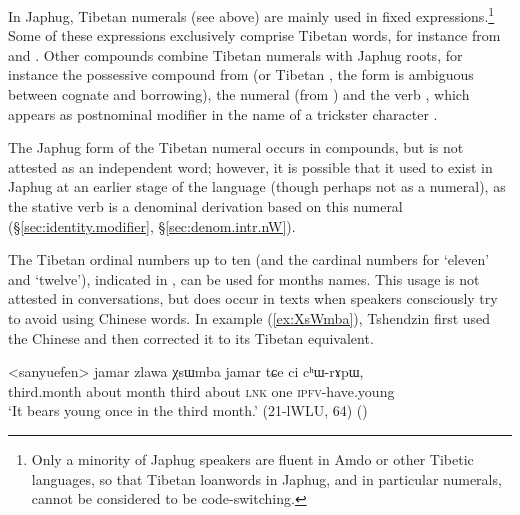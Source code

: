 In Japhug, Tibetan numerals (see  above) are mainly used in fixed expressions.\footnote{Only a minority of Japhug speakers are fluent in Amdo or other Tibetic languages, so that Tibetan loanwords in Japhug, and in particular numerals, cannot be considered to be code-switching. 
} Some of these expressions exclusively comprise Tibetan words, for instance  from  and .  Other compounds combine Tibetan numerals with Japhug roots, for instance the possessive compound from  (or Tibetan , the form is ambiguous between cognate and borrowing), the numeral  (from  ) and the verb , which appears as postnominal modifier in the name of a trickster character .
 
The Japhug form  of the Tibetan numeral   occurs in compounds, but is not attested as an independent word; however, it is possible that  it used to exist in Japhug at an earlier stage of the language (though perhaps not as a numeral), as the stative verb  is a denominal derivation based on this numeral (§\ref{sec:identity.modifier}, §\ref{sec:denom.intr.nW}). 

The Tibetan ordinal numbers up to ten (and the cardinal numbers for `eleven' and `twelve'), indicated in , can be used for months names. This usage is not attested in conversations, but does occur in texts when  speakers consciously try to avoid using Chinese words. In example (\ref{ex:XsWmba}), Tshendzin first used the Chinese  and then corrected it to its Tibetan equivalent. 

\begin{exe}
\ex \label{ex:XsWmba}
\gll <sanyuefen> jamar zlawa χsɯmba jamar tɕe ci cʰɯ-rɤpɯ, \\
 third.month about month third about \textsc{lnk} one \textsc{ipfv}-have.young  \\
\glt `It bears young once in the third month.' (21-lWLU, 64)
()
\end{exe}

